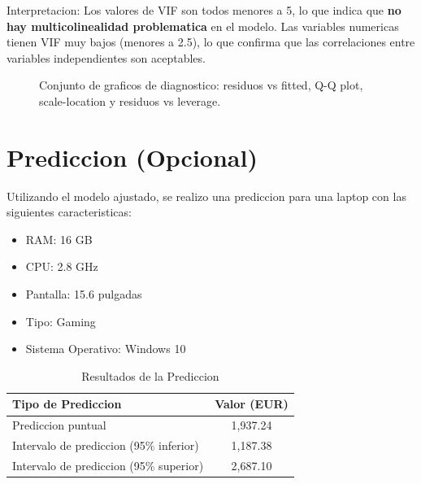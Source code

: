 \documentclass[12pt,a4paper]{article}
\begin{document}
Interpretacion: Los valores de VIF son todos menores a 5, lo que indica que \textbf{no hay multicolinealidad problematica} en el modelo. Las variables numericas tienen VIF muy bajos (menores a 2.5), lo que confirma que las correlaciones entre variables independientes son aceptables.

\begin{figure}[H]
    \centering
    \caption{Conjunto de graficos de diagnostico: residuos vs fitted, Q-Q plot, scale-location y residuos vs leverage.}
    \label{fig:diagnostico}
\end{figure}

\section{Prediccion (Opcional)}

Utilizando el modelo ajustado, se realizo una prediccion para una laptop con las siguientes caracteristicas:

\begin{itemize}
    \item RAM: 16 GB
    \item CPU: 2.8 GHz
    \item Pantalla: 15.6 pulgadas
    \item Tipo: Gaming
    \item Sistema Operativo: Windows 10
\end{itemize}

\begin{table}[H]
\centering
\caption{Resultados de la Prediccion}
\begin{tabular}{lc}
\toprule
\textbf{Tipo de Prediccion} & \textbf{Valor (EUR)} \\
\midrule
Prediccion puntual & 1,937.24 \\
Intervalo de prediccion (95\% inferior) & 1,187.38 \\
Intervalo de prediccion (95\% superior) & 2,687.10 \\
\bottomrule
\end{tabular}
\end{table}
\end{document}
